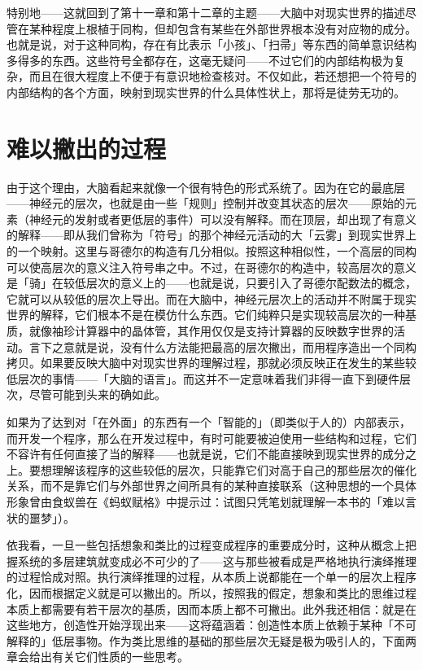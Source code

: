 \documentclass[
  12pt,
  twoside,
  openright,
  oldfontcommands,
]{memoir}
\begin{document}
特别地------这就回到了第十一章和第十二章的主题------大脑中对现实世界的描述尽管在某种程度上根植于同构，但却包含有某些在外部世界根本没有对应物的成分。也就是说，对于这种同构，存在有比表示「小孩」、「扫帚」等东西的简单意识结构多得多的东西。这些符号全都存在，这毫无疑问------不过它们的内部结构极为复杂，而且在很大程度上不便于有意识地检查核对。不仅如此，若还想把一个符号的内部结构的各个方面，映射到现实世界的什么具体性状上，那将是徒劳无功的。

\section{难以撇出的过程}

由于这个理由，大脑看起来就像一个很有特色的形式系统了。因为在它的最底层------神经元的层次，也就是由一些「规则」控制并改变其状态的层次------原始的元素（神经元的发射或者更低层的事件）可以没有解释。而在顶层，却出现了有意义的解释------即从我们曾称为「符号」的那个神经元活动的大「云雾」到现实世界上的一个映射。这里与哥德尔的构造有几分相似。按照这种相似性，一个高层的同构可以使高层次的意义注入符号串之中。不过，在哥德尔的构造中，较高层次的意义是「骑」在较低层次的意义上的------也就是说，只要引入了哥德尔配数法的概念，它就可以从较低的层次上导出。而在大脑中，神经元层次上的活动并不附属于现实世界的解释，它们根本不是在模仿什么东西。它们纯粹只是实现较高层次的一种基质，就像袖珍计算器中的晶体管，其作用仅仅是支持计算器的反映数字世界的活动。言下之意就是说，没有什么方法能把最高的层次撇出，而用程序造出一个同构拷贝。如果要反映大脑中对现实世界的理解过程，那就必须反映正在发生的某些较低层次的事情------「大脑的语言」。而这并不一定意味着我们非得一直下到硬件层次，尽管可能到头来的确如此。

如果为了达到对「在外面」的东西有一个「智能的」（即类似于人的）内部表示，而开发一个程序，那么在开发过程中，有时可能要被迫使用一些结构和过程，它们不容许有任何直接了当的解释------也就是说，它们不能直接映到现实世界的成分之上。要想理解该程序的这些较低的层次，只能靠它们对高于自己的那些层次的催化关系，而不是靠它们与外部世界之间所具有的某种直接联系（这种思想的一个具体形象曾由食蚁兽在《蚂蚁赋格》中提示过：试图只凭笔划就理解一本书的「难以言状的噩梦」）。

依我看，一旦一些包括想象和类比的过程变成程序的重要成分时，这种从概念上把握系统的多层建筑就变成必不可少的了------这与那些被看成是严格地执行演绎推理的过程恰成对照。执行演绎推理的过程，从本质上说都能在一个单一的层次上程序化，因而根据定义就是可以撇出的。所以，按照我的假定，想象和类比的思维过程本质上都需要有若干层次的基质，因而本质上都不可撇出。此外我还相信：就是在这些地方，创造性开始浮现出来------这将蕴涵着：创造性本质上依赖于某种「不可解释的」低层事物。作为类比思维的基础的那些层次无疑是极为吸引人的，下面两章会给出有关它们性质的一些思考。
\end{document}
